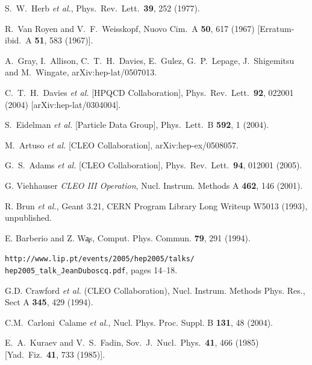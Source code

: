 \documentclass[aps,prl,superscriptaddress,showpacs,floatfix]{revtex4}
\begin{document}
\begin{thebibliography}{99}

S.~W.~Herb {\it et al.},
Phys.\ Rev.\ Lett.\  {\bf 39}, 252 (1977).

R.~Van Royen and V.~F.~Weisskopf,
Nuovo Cim.\ A {\bf 50}, 617 (1967)
[Erratum-ibid.\ A {\bf 51}, 583 (1967)].

A.~Gray, I.~Allison, C.~T.~H.~Davies, E.~Gulez, G.~P.~Lepage, J.~Shigemitsu and M.~Wingate,
arXiv:hep-lat/0507013.

C.~T.~H.~Davies {\it et al.}  [HPQCD Collaboration],
Phys.\ Rev.\ Lett.\  {\bf 92}, 022001 (2004)
[arXiv:hep-lat/0304004].

S.~Eidelman {\it et al.}  [Particle Data Group],
Phys.\ Lett.\ B {\bf 592}, 1 (2004).

M.~Artuso {\it et al.}  [CLEO Collaboration],
arXiv:hep-ex/0508057.

G.~S.~Adams {\it et al.}  [CLEO Collaboration],
Phys.\ Rev.\ Lett.\  {\bf 94}, 012001 (2005).

G. Viehhauser {\it CLEO III Operation},
Nucl. Instrum. Methods A {\bf 462}, 146 (2001).

R. Brun {\it et al.}, {\textsc Geant} 3.21, CERN Program Library Long
Writeup W5013 (1993), unpublished.

E. Barberio and Z. W\c{a}s, Comput. Phys. Commun. {\bf 79}, 291 (1994).

{\tt http://www.lip.pt/events/2005/hep2005/talks/ hep2005\_talk\_JeanDuboscq.pdf},
pages 14--18.

G.D. Crawford {\it et al.} (CLEO Collaboration),
Nucl. Instrum. Methods Phys. Res., Sect A {\bf 345}, 429 (1994).

C.M.~Carloni~Calame {\sl et al.},
Nucl. Phys. Proc. Suppl. B {\bf 131}, 48 (2004).

E.~A.~Kuraev and V.~S.~Fadin,
Sov.\ J.\ Nucl.\ Phys.\  {\bf 41}, 466 (1985)
[Yad.\ Fiz.\  {\bf 41}, 733 (1985)].

\end{thebibliography}
\end{document}
